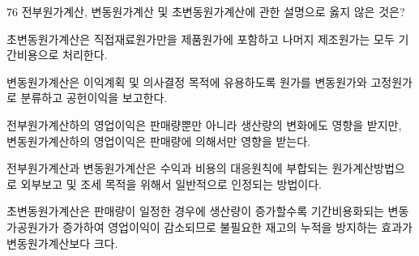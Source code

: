 \begin{question}{76}
전부원가계산, 변동원가계산 및 초변동원가계산에 관한 설명으로 옳지 않은 것은?
\begin{choices}
  \item 초변동원가계산은 직접재료원가만을 제품원가에 포함하고 나머지 제조원가는 모두 기간비용으로 처리한다.
  \item 변동원가계산은 이익계획 및 의사결정 목적에 유용하도록 원가를 변동원가와 고정원가로 분류하고 공헌이익을 보고한다.
  \item 전부원가계산하의 영업이익은 판매량뿐만 아니라 생산량의 변화에도 영향을 받지만, 변동원가계산하의 영업이익은 판매량에 의해서만 영향을 받는다.
  \item 전부원가계산과 변동원가계산은 수익과 비용의 대응원칙에 부합되는 원가계산방법으로 외부보고 및 조세 목적을 위해서 일반적으로 인정되는 방법이다.
  \item 초변동원가계산은 판매량이 일정한 경우에 생산량이 증가할수록 기간비용화되는 변동 가공원가가 증가하여 영업이익이 감소되므로 불필요한 재고의 누적을 방지하는 효과가 변동원가계산보다 크다.
\end{choices}
\end{question}
